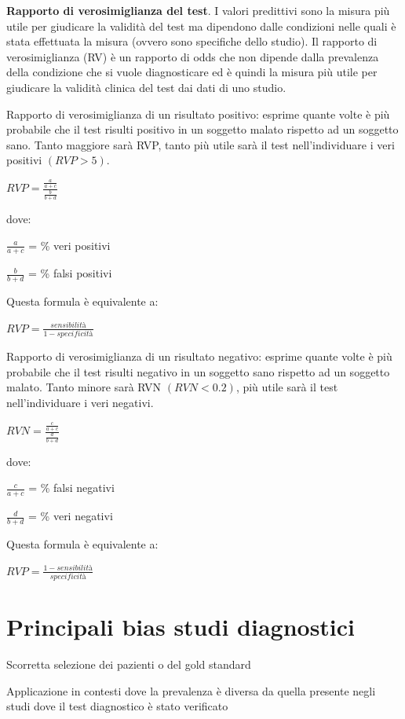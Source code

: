 \documentclass[]{book}
\begin{document}
\textbf{Rapporto di verosimiglianza del test}.
I valori predittivi sono la misura più utile per giudicare la validità del test ma dipendono dalle condizioni nelle quali è stata effettuata la misura (ovvero sono specifiche dello studio). Il rapporto di verosimiglianza (RV) è un rapporto di odds che non dipende dalla prevalenza della condizione che si vuole diagnosticare ed è quindi la misura più utile per giudicare la validità clinica del test dai dati di uno studio.

Rapporto di verosimiglianza di un risultato positivo: esprime quante volte è più probabile che il test risulti positivo in un soggetto malato rispetto ad un soggetto sano. Tanto maggiore sarà RVP, tanto più utile sarà il test nell'individuare i veri positivi \((RVP > 5)\).

\(RVP = \frac{\frac {a}{a+c}}{\frac {b}{b+d}}\)

dove:

\(\frac {a}{a+c}\) = \% veri positivi

\(\frac {b}{b+d}\) = \% falsi positivi

Questa formula è equivalente a:

\(RVP = \frac {sensibilità}{1-specificità}\)

Rapporto di verosimiglianza di un risultato negativo: esprime quante volte è più probabile che il test risulti negativo in un soggetto sano rispetto ad un soggetto malato. Tanto minore sarà RVN \((RVN < 0.2)\), più utile sarà il test nell'individuare i veri negativi.

\(RVN = \frac{\frac {c}{a+c}}{\frac {d}{b+d}}\)

dove:

\(\frac {c}{a+c}\) = \% falsi negativi

\(\frac {d}{b+d}\) = \% veri negativi

Questa formula è equivalente a:

\(RVP = \frac {1-sensibilità}{specificità}\)

\hypertarget{principali-bias-studi-diagnostici}{%
\section{Principali bias studi diagnostici}\label{principali-bias-studi-diagnostici}}

Scorretta selezione dei pazienti o del gold standard

Applicazione in contesti dove la prevalenza è diversa da quella presente negli studi dove il test diagnostico è stato verificato
\end{document}
